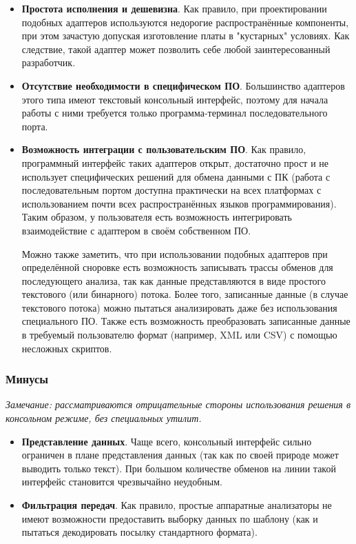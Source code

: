 \begin{itemize}

 \item \textbf{Простота исполнения и дешевизна}. Как правило, при проектировании подобных адаптеров используются недорогие распространённые компоненты, при этом зачастую допуская изготовление платы в "кустарных" условиях. Как следствие, такой адаптер может позволить себе любой заинтересованный разработчик.

 \item \textbf{Отсутствие необходимости в специфическом ПО}. Большинство адаптеров этого типа имеют текстовый консольный интерфейс, поэтому для начала работы с ними требуется только программа-терминал последовательного порта.

 \item \textbf{Возможность интеграции с пользовательским ПО}. Как правило, программный интерфейс таких адаптеров открыт, достаточно прост и не использует специфических решений для обмена данными с ПК (работа с последовательным портом доступна практически на всех платформах с использованием почти всех распространённых языков программирования). Таким образом, у пользователя есть возможность интегрировать взаимодействие с адаптером в своём собственном ПО.
 
Можно также заметить, что при использовании подобных адаптеров при определённой сноровке есть возможность записывать трассы обменов для последующего анализа, так как данные представляются в виде простого текстового (или бинарного) потока. Более того, записанные данные (в случае текстового потока) можно пытаться анализировать даже без использования специального ПО. Также есть возможность преобразовать записанные данные в требуемый пользователю формат (например, XML или CSV) с помощью несложных скриптов.

\end{itemize}

\subsubsection*{Минусы}

\textit{Замечание: рассматриваются отрицательные стороны использования решения в консольном режиме, без специальных утилит.}

\begin{itemize}
 \item \textbf{Представление данных}. Чаще всего, консольный интерфейс сильно ограничен в плане представления данных (так как по своей природе может выводить только текст). При большом количестве обменов на линии такой интерфейс становится чрезвычайно неудобным.
 
 \item \textbf{Фильтрация передач}. Как правило, простые аппаратные анализаторы не имеют возможности предоставить выборку данных по шаблону (как и пытаться декодировать посылку стандартного формата).
\end{itemize}

